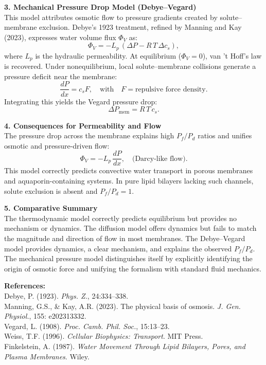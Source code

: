 \begin{technical}
\noindent\textbf{3. Mechanical Pressure Drop Model (Debye–Vegard)}\\[0.5em]
This model attributes osmotic flow to pressure gradients created by solute–membrane exclusion. Debye’s 1923 treatment, refined by Manning and Kay (2023), expresses water volume flux $\Phi_V$ as:
\begin{equation}
\Phi_V = -L_p\,(\Delta P - R\,T\,\Delta c_s),
\end{equation}
where $L_p$ is the hydraulic permeability. At equilibrium ($\Phi_V = 0$), van ’t Hoff’s law is recovered. Under nonequilibrium, local solute–membrane collisions generate a pressure deficit near the membrane:
\begin{equation}
\frac{dP}{dx} = c_s F, \quad\text{with} \quad F = \text{repulsive force density}.
\end{equation}
Integrating this yields the Vegard pressure drop:
\begin{equation}
\Delta P_\text{mem} = R\,T\,c_s.
\end{equation}

\noindent\textbf{4. Consequences for Permeability and Flow}\\[0.5em]
The pressure drop across the membrane explains high $P_f / P_d$ ratios and unifies osmotic and pressure-driven flow:
\begin{equation}
\Phi_V = -L_p\,\frac{dP}{dx}, \quad \text{(Darcy-like flow)}.
\end{equation}
This model correctly predicts convective water transport in porous membranes and aquaporin-containing systems. In pure lipid bilayers lacking such channels, solute exclusion is absent and $P_f / P_d = 1$.

\noindent\textbf{5. Comparative Summary}\\[0.5em]
The thermodynamic model correctly predicts equilibrium but provides no mechanism or dynamics. The diffusion model offers dynamics but fails to match the magnitude and direction of flow in most membranes. The Debye–Vegard model provides dynamics, a clear mechanism, and explains the observed $P_f / P_d$. The mechanical pressure model distinguishes itself by explicitly identifying the origin of osmotic force and unifying the formalism with standard fluid mechanics.

\vspace{0.5em}
\noindent\textbf{References:}\\
Debye, P. (1923). \textit{Phys. Z.}, 24:334--338.\\
Manning, G.S., \& Kay, A.R. (2023). The physical basis of osmosis. \textit{J. Gen. Physiol.}, 155: e202313332.\\
Vegard, L. (1908). \textit{Proc. Camb. Phil. Soc.}, 15:13--23.\\
Weiss, T.F. (1996). \textit{Cellular Biophysics: Transport}. MIT Press.\\
Finkelstein, A. (1987). \textit{Water Movement Through Lipid Bilayers, Pores, and Plasma Membranes}. Wiley.
\end{technical}
